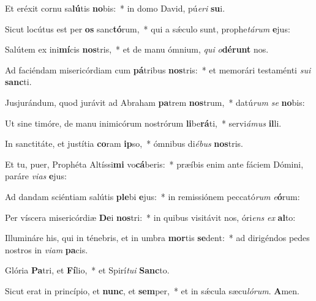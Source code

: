 
Et eréxit cornu sa\textbf{lú}tis \textbf{no}bis:~* in domo David, pú\textit{e}\textit{ri} \textbf{su}i.

Sicut locútus est per \textbf{os} sanc\textbf{tó}rum,~* qui a sǽculo sunt, prophe\textit{tá}\textit{rum} \textbf{e}jus:

Salútem ex ini\textbf{mí}cis \textbf{nos}tris,~* et de manu ómnium, \textit{qui} \textit{o}\textbf{dé}\textbf{runt} nos.

Ad faciéndam misericórdiam cum \textbf{pá}tribus \textbf{nos}tris:~* et memorári testaménti \textit{su}\textit{i} \textbf{sanc}ti.

Jusjurándum, quod jurávit ad Abraham \textbf{pa}trem \textbf{nos}trum,~* datú\textit{rum} \textit{se} \textbf{no}bis:

Ut sine timóre, de manu inimicórum nostrórum \textbf{li}be\textbf{rá}ti,~* servi\textit{á}\textit{mus} \textbf{il}li.

In sanctitáte, et justítia \textbf{co}ram \textbf{ip}so,~* ómnibus di\textit{é}\textit{bus} \textbf{nos}tris.

Et tu, puer, Prophéta Altíssi\textbf{mi} vo\textbf{cá}beris:~* præíbis enim ante fáciem Dómini, paráre \textit{vi}\textit{as} \textbf{e}jus:

Ad dandam sciéntiam salútis \textbf{ple}bi \textbf{e}jus:~* in remissiónem peccató\textit{rum} \textit{e}\textbf{ó}rum:

Per víscera misericórdiæ \textbf{De}i \textbf{nos}tri:~* in quibus visitávit nos, óri\textit{ens} \textit{ex} \textbf{al}to:

Illumináre his, qui in ténebris, et in umbra \textbf{mor}tis \textbf{se}dent:~* ad dirigéndos pedes nostros in \textit{vi}\textit{am} \textbf{pa}cis.

Glória \textbf{Pa}tri, et \textbf{Fí}lio,~* et Spirí\textit{tu}\textit{i} \textbf{Sanc}to.

Sicut erat in princípio, et \textbf{nunc}, et \textbf{sem}per,~* et in sǽcula sæcu\textit{ló}\textit{rum}. \textbf{A}men.
